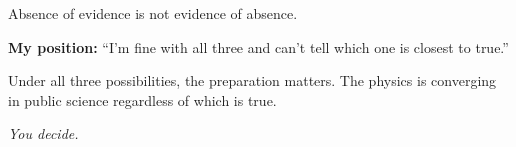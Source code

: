\vspace{0.5cm}

Absence of evidence is not evidence of absence.

\vspace{0.5cm}

\noindent\textbf{My position:} ``I'm fine with all three and can't tell which one is closest to true.''

Under all three possibilities, the preparation matters. The physics is converging in public science regardless of which is true.

\vspace{0.5cm}

\begin{center}
\textit{You decide.}
\end{center}

\chapterreturn
